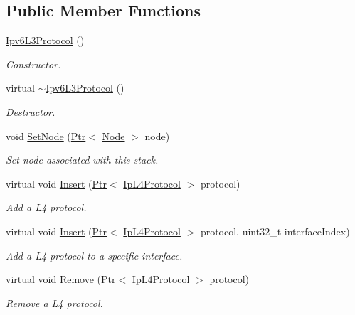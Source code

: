 \subsection*{Public Member Functions}
\begin{DoxyCompactItemize}
\item 
\hyperlink{classns3_1_1Ipv6L3Protocol_aed69fbc6c2eca9a88dfb50f12b419902}{Ipv6\+L3\+Protocol} ()
\begin{DoxyCompactList}\small\item\em Constructor. \end{DoxyCompactList}\item 
virtual \hyperlink{classns3_1_1Ipv6L3Protocol_a169c63b470b2de16ee8c9d5e241488a8}{$\sim$\+Ipv6\+L3\+Protocol} ()
\begin{DoxyCompactList}\small\item\em Destructor. \end{DoxyCompactList}\item 
void \hyperlink{classns3_1_1Ipv6L3Protocol_a53796a2747cb5edcd1c762f44043b061}{Set\+Node} (\hyperlink{classns3_1_1Ptr}{Ptr}$<$ \hyperlink{classns3_1_1Node}{Node} $>$ node)
\begin{DoxyCompactList}\small\item\em Set node associated with this stack. \end{DoxyCompactList}\item 
virtual void \hyperlink{classns3_1_1Ipv6L3Protocol_afcdf13ca065622b8cb4691f2d3e92002}{Insert} (\hyperlink{classns3_1_1Ptr}{Ptr}$<$ \hyperlink{classns3_1_1IpL4Protocol}{Ip\+L4\+Protocol} $>$ protocol)
\begin{DoxyCompactList}\small\item\em Add a L4 protocol. \end{DoxyCompactList}\item 
virtual void \hyperlink{classns3_1_1Ipv6L3Protocol_a8b7f000d9d6d897dff787bfddab34872}{Insert} (\hyperlink{classns3_1_1Ptr}{Ptr}$<$ \hyperlink{classns3_1_1IpL4Protocol}{Ip\+L4\+Protocol} $>$ protocol, uint32\+\_\+t interface\+Index)
\begin{DoxyCompactList}\small\item\em Add a L4 protocol to a specific interface. \end{DoxyCompactList}\item 
virtual void \hyperlink{classns3_1_1Ipv6L3Protocol_a70024f0b3f0cca53815ddf98eb49176a}{Remove} (\hyperlink{classns3_1_1Ptr}{Ptr}$<$ \hyperlink{classns3_1_1IpL4Protocol}{Ip\+L4\+Protocol} $>$ protocol)
\begin{DoxyCompactList}\small\item\em Remove a L4 protocol. \end{DoxyCompactList}\item 

\end{DoxyCompactItemize}
